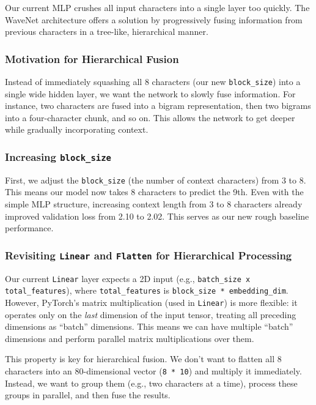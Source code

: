 Our current MLP crushes all input characters into a single layer too quickly. The WaveNet architecture offers a solution by progressively fusing information from previous characters in a tree-like, hierarchical manner.

\subsubsection{Motivation for Hierarchical Fusion}
Instead of immediately squashing all 8 characters (our new \texttt{block\_size}) into a single wide hidden layer, we want the network to slowly fuse information. For instance, two characters are fused into a bigram representation, then two bigrams into a four-character chunk, and so on. This allows the network to get deeper while gradually incorporating context.

\subsubsection{Increasing \texttt{block\_size}}
First, we adjust the \texttt{block\_size} (the number of context characters) from 3 to 8. This means our model now takes 8 characters to predict the 9th. Even with the simple MLP structure, increasing context length from 3 to 8 characters already improved validation loss from 2.10 to 2.02. This serves as our new rough baseline performance.

\subsubsection{Revisiting \texttt{Linear} and \texttt{Flatten} for Hierarchical Processing}

Our current \texttt{Linear} layer expects a 2D input (e.g., \texttt{batch\_size x total\_features}), where \texttt{total\_features} is \texttt{block\_size * embedding\_dim}. However, PyTorch's matrix multiplication (used in \texttt{Linear}) is more flexible: it operates only on the \textit{last} dimension of the input tensor, treating all preceding dimensions as ``batch'' dimensions. This means we can have multiple ``batch'' dimensions and perform parallel matrix multiplications over them.

This property is key for hierarchical fusion. We don't want to flatten all 8 characters into an 80-dimensional vector (\texttt{8 * 10}) and multiply it immediately. Instead, we want to group them (e.g., two characters at a time), process these groups in parallel, and then fuse the results.

